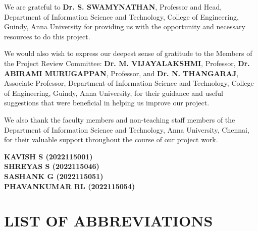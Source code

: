 \documentclass[12pt,a4paper]{report}
\numberwithin{algorithm}{chapter}
\begin{document}
\vspace{0.4cm}

We are grateful to \textbf{Dr. S. SWAMYNATHAN}, Professor and Head, Department of Information Science and Technology, College of Engineering, Guindy, Anna University for providing us with the opportunity and necessary resources to do this project.

\vspace{0.4cm}

We would also wish to express our deepest sense of gratitude to the Members of the Project Review Committee: \textbf{Dr. M. VIJAYALAKSHMI}, Professor, \textbf{Dr. ABIRAMI MURUGAPPAN}, Professor, and \textbf{Dr. N. THANGARAJ}, Associate Professor, Department of Information Science and Technology, College of Engineering, Guindy, Anna University, for their guidance and useful suggestions that were beneficial in helping us improve our project.

\vspace{0.4cm}

We also thank the faculty members and non-teaching staff members of the Department of Information Science and Technology, Anna University, Chennai, for their valuable support throughout the course of our project work.

\vspace{1cm}

\begin{flushleft}
\textbf{KAVISH S (2022115001)}\\
\textbf{SHREYAS S (2022115046)}\\
\textbf{SASHANK G (2022115051)}\\
\textbf{PHAVANKUMAR RL (2022115054)}
\end{flushleft}

\newpage
\tableofcontents

\newpage
\listoftables
{}

\newpage
\listoffigures
{}

\chapter*{LIST OF ABBREVIATIONS}
\end{document}
